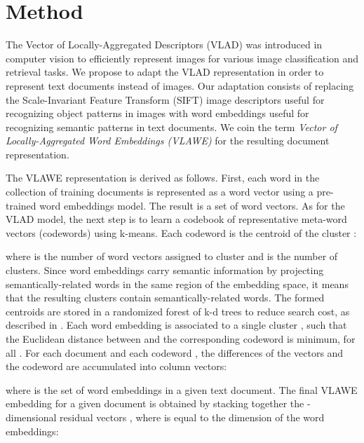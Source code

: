 \documentclass[11pt,a4paper]{article}
\begin{document}
\vspace*{-0.1cm}
\section{Method}
\label{sec:M}
\vspace*{-0.1cm}

The Vector of Locally-Aggregated Descriptors (VLAD) \cite{Jegou-CVPR-2010,Jegou-PAMI-2012} was introduced in computer vision to efficiently represent images for various image classification and retrieval tasks. We propose to adapt the VLAD representation in order to represent text documents instead of images. Our adaptation consists of replacing the Scale-Invariant Feature Transform (SIFT) image descriptors \cite{Lowe-SIFT-2004} useful for recognizing object patterns in images with word embeddings \cite{Mikolov-NIPS-2013,Pennington-EMNLP-2014} useful for recognizing semantic patterns in text documents. We coin the term \emph{Vector of Locally-Aggregated Word Embeddings (VLAWE)} for the resulting document representation. 

The VLAWE representation is derived as follows. First, each word in the collection of training documents is represented as a word vector using a pre-trained word embeddings model. The result is a set  of  word vectors. As for the VLAD model, the next step is to learn a codebook  of representative meta-word vectors (codewords) using k-means. Each codeword  is the centroid of the cluster :

where  is the number of word vectors assigned to cluster  and  is the number of clusters. Since word embeddings carry semantic information by projecting semantically-related words in the same region of the embedding space, it means that the resulting clusters contain semantically-related words. The formed centroids are stored in a randomized forest of k-d trees to reduce search cost, as described in \cite{Philbin-2007,Ionescu-WREPL-2013,Ionescu-ICIP-2014,Ionescu-ICIAP-2015}. Each word embedding  is associated to a single cluster , such that the Euclidean distance between  and the corresponding codeword  is minimum, for all . For each document  and each codeword , the differences  of the vectors  and the codeword  are accumulated into column vectors:

where  is the set of word embeddings in a given text document. The final VLAWE embedding for a given document  is obtained by stacking together the -dimensional residual vectors , where  is equal to the dimension of the word embeddings:
\end{document}
